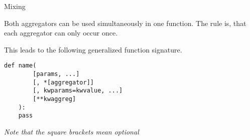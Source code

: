\begin{frame}[fragile]

\begin{block}{Mixing}

Both aggregators can be used simultaneously in one function. The rule
is, that each aggregator can only occur once.

\begin{Shaded}
\begin{Highlighting}[]
 
        \OperatorTok{*}
        \OperatorTok{=}\NormalTok{,}
        \OperatorTok{=}\NormalTok{,}
        \OperatorTok{**}
    \NormalTok{):}
\end{Highlighting}
\end{Shaded}

\end{block}

\end{frame}

\begin{frame}[fragile]

This leads to the following generalized function signature.

\begin{verbatim}
def name(
        [params, ...]
        [, *[aggregator]]
        [, kwparams=kwvalue, ...]
        [**kwaggreg]
    ):
    pass
\end{verbatim}

\emph{Note that the square brackets mean optional}

\end{frame}
